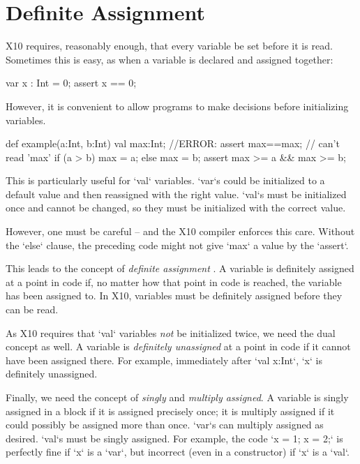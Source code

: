 \chapter{Definite Assignment}
\label{sect:DefiniteAssignment}

X10 requires, reasonably enough, that every variable be set before it is read.
Sometimes this is easy, as when a variable is declared and assigned together: 
\begin{xten}
  var x : Int = 0;
  assert x == 0;
\end{xten}
However, it is convenient to allow programs to make decisions before
initializing variables.
\begin{xten}
def example(a:Int, b:Int) {
  val max:Int;
  //ERROR: assert max==max; // can't read 'max'
  if (a > b) max = a;
  else max = b;
  assert max >= a && max >= b;
}
\end{xten}
This is particularly useful for \xcd`val` variables.  \xcd`var`s could be
initialized to a default value and then reassigned with the right value.
\xcd`val`s must be initialized once and cannot be changed, so they must be
initialized with the correct value. 

However, one must be careful -- and the X10 compiler enforces this care.
Without the \xcd`else` clause, the preceding code might not give \xcd`max` a
value by the \xcd`assert`.  

This leads to the concept of {\em definite assignment} \cite{Javasomething}.
A variable is definitely assigned at a point in code if, no matter how that
point in code is reached, the variable has been assigned to.  In X10,
variables must be definitely assigned before they can be read.


As X10 requires that \xcd`val` variables {\em not} be initialized
twice,  we need the dual concept as well.  A variable is {\em definitely
unassigned} at a point in code if it cannot have been assigned there.  For
example, immediately after \xcd`val x:Int`, \xcd`x` is definitely unassigned. 

Finally, we need the concept of {\em singly} and {\em multiply assigned}.
A variable is singly assigned in a block if it is assigned precisely
once; it is multiply assigned if it could possibly be assigned more than once.  
\xcd`var`s can  multiply assigned as desired. \xcd`val`s must be singly
assigned.  For example, the code \xcd`x = 1; x = 2;` is perfectly fine if
\xcd`x` is a \xcd`var`, but incorrect (even in a constructor) if \xcd`x` is a
\xcd`val`.  

